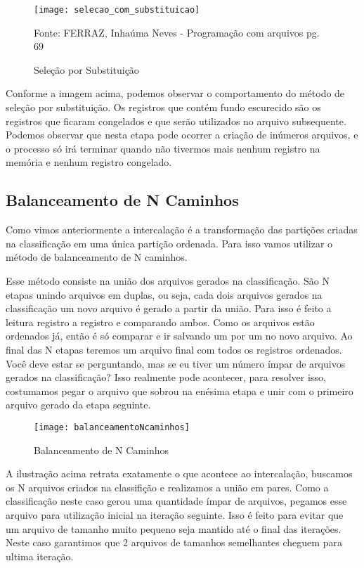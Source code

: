 \begin{figure}[h]
\texttt{[image: selecao\_com\_substituicao]}
\caption[align = center]{Seleção por Substituição} 
\label{fig:selecao_com_substituicao}
\begin{center}
Fonte: FERRAZ, Inhaúma Neves - Programação com arquivos pg. 69
\end{center}
\end{figure}
Conforme a imagem acima, podemos observar o comportamento do método de seleção por substituição. Os registros que contém fundo escurecido são os registros que ficaram congelados e que serão utilizados no arquivo subsequente. Podemos observar que nesta etapa pode ocorrer a criação de inúmeros arquivos, e o processo só irá terminar quando não tivermos mais nenhum registro na memória e nenhum registro congelado. 
\newpage

\subsection{Balanceamento de N Caminhos}

Como vimos anteriormente a intercalação é a transformação das partições criadas na classificação em uma única partição ordenada. Para isso vamos utilizar o método de balanceamento de N caminhos.\par
Esse método consiste na união dos arquivos gerados na classificação. São N etapas unindo arquivos em duplas, ou seja, cada dois arquivos gerados na classificação um novo arquivo é gerado a partir da união. Para isso é feito a leitura registro a registro e comparando ambos. Como os arquivos estão ordenados já, então é só comparar e ir salvando um por um no novo arquivo. Ao final das N etapas teremos um arquivo final com todos os registros ordenados. Você deve estar se perguntando, mas se eu tiver um número ímpar de arquivos gerados na classificação? Isso realmente pode acontecer, para resolver isso, costumamos pegar o arquivo que sobrou na enésima etapa e unir com o primeiro arquivo gerado da etapa seguinte.

\begin{figure}[h]
\texttt{[image: balanceamentoNcaminhos]}
\caption{Balanceamento de N Caminhos}
\label{fig:balanceamentoNcaminhos}
\end{figure}

A ilustração acima retrata exatamente o que acontece ao intercalação, buscamos os N arquivos criados na classifição e realizamos a união em pares. Como a classificação neste caso gerou uma quantidade ímpar de arquivos, pegamos esse arquivo para utilização inicial na iteração seguinte. Isso é feito para evitar que um arquivo de tamanho muito pequeno seja mantido até o final das iterações. Neste caso garantimos que 2 arquivos de tamanhos semelhantes cheguem para ultima iteração. 
